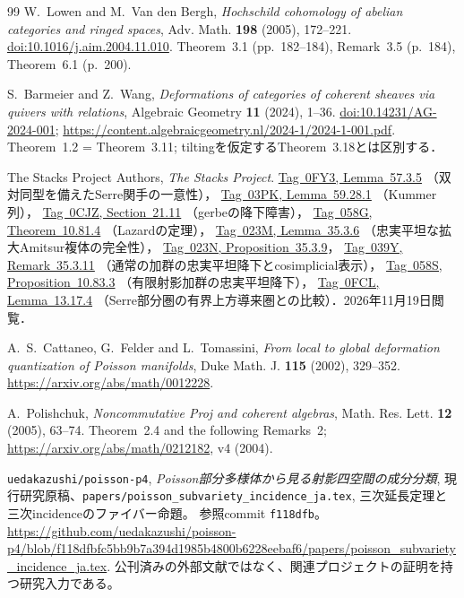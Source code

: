 \documentclass[11pt,a4paper]{ltjsarticle}
\numberwithin{equation}{section}
\begin{document}
\begin{thebibliography}{99}
W.~Lowen and M.~Van den Bergh,
\emph{Hochschild cohomology of abelian categories and ringed spaces},
Adv. Math. \textbf{198} (2005), 172--221.
\href{https://doi.org/10.1016/j.aim.2004.11.010}{doi:10.1016/j.aim.2004.11.010}.
Theorem~3.1 (pp.~182--184), Remark~3.5 (p.~184), Theorem~6.1 (p.~200).

S.~Barmeier and Z.~Wang,
\emph{Deformations of categories of coherent sheaves via quivers with relations},
Algebraic Geometry \textbf{11} (2024), 1--36.
\href{https://doi.org/10.14231/AG-2024-001}{doi:10.14231/AG-2024-001};
\url{https://content.algebraicgeometry.nl/2024-1/2024-1-001.pdf}.
Theorem~1.2 = Theorem~3.11; tiltingを仮定するTheorem~3.18とは区別する．

The Stacks Project Authors, \emph{The Stacks Project}.
\href{https://stacks.math.columbia.edu/tag/0FY3}{Tag~0FY3, Lemma~57.3.5}
（双対同型を備えたSerre関手の一意性），
\href{https://stacks.math.columbia.edu/tag/03PK}{Tag~03PK, Lemma~59.28.1}
（Kummer列），
\href{https://stacks.math.columbia.edu/tag/0CJZ}{Tag~0CJZ, Section~21.11}
（gerbeの降下障害），
\href{https://stacks.math.columbia.edu/tag/058G}{Tag~058G, Theorem~10.81.4}
（Lazardの定理），
\href{https://stacks.math.columbia.edu/tag/023M}{Tag~023M, Lemma~35.3.6}
（忠実平坦な拡大Amitsur複体の完全性），
\href{https://stacks.math.columbia.edu/tag/023N}{Tag~023N, Proposition~35.3.9}，
\href{https://stacks.math.columbia.edu/tag/039Y}{Tag~039Y, Remark~35.3.11}
（通常の加群の忠実平坦降下とcosimplicial表示），
\href{https://stacks.math.columbia.edu/tag/058S}{Tag~058S, Proposition~10.83.3}
（有限射影加群の忠実平坦降下），
\href{https://stacks.math.columbia.edu/tag/0FCL}{Tag~0FCL, Lemma~13.17.4}
（Serre部分圏の有界上方導来圏との比較）．2026年11月19日閲覧．

A.~S.~Cattaneo, G.~Felder and L.~Tomassini,
\emph{From local to global deformation quantization of Poisson manifolds},
Duke Math. J. \textbf{115} (2002), 329--352.
\url{https://arxiv.org/abs/math/0012228}.

A.~Polishchuk,
\emph{Noncommutative Proj and coherent algebras},
Math. Res. Lett. \textbf{12} (2005), 63--74.
Theorem~2.4 and the following Remarks~2;
\url{https://arxiv.org/abs/math/0212182}, v4 (2004).

\texttt{uedakazushi/poisson-p4},
\emph{Poisson部分多様体から見る射影四空間の成分分類},
現行研究原稿、\nolinkurl{papers/poisson_subvariety_incidence_ja.tex},
三次延長定理と三次incidenceのファイバー命題。
参照commit \texttt{f118dfb}。
\url{https://github.com/uedakazushi/poisson-p4/blob/f118dfbfc5bb9b7a394d1985b4800b6228eebaf6/papers/poisson_subvariety_incidence_ja.tex}.
公刊済みの外部文献ではなく、関連プロジェクトの証明を持つ研究入力である。


\end{thebibliography}
\end{document}
